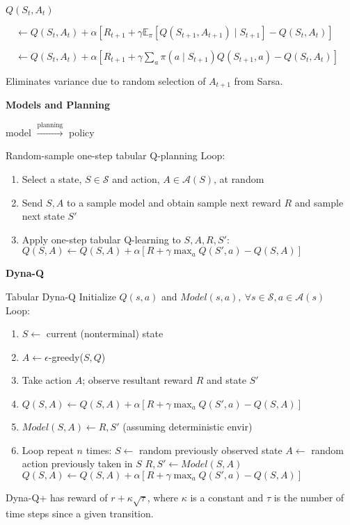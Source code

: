 \documentclass[twocolumn]{article}
\begin{document}
$Q(S_t, A_t)$

$\quad \leftarrow Q(S_t, A_t) + \alpha [R_{t+1} + \gamma \mathbb E_\pi [Q(S_{t+1}, A_{t+1}) \mid S_{t+1}] - Q(S_t, A_t)]$

$\quad\leftarrow Q(S_t, A_t) + \alpha[R_{t+1} + \gamma \sum_a \pi(a \mid S_{t+1}) Q(S_{t+1}, a) - Q(S_t, A_t)]$

Eliminates variance due to random selection of $A_{t+1}$ from Sarsa.


\newpage


\textbf{Models and Planning}

model $\xrightarrow{\text{planning}}$ policy

\begin{mydef}{Random-sample one-step tabular Q-planning}{}
    Loop:
    \begin{enumerate}
        \item Select a state, $S \in \mathcal S$ and action, $A \in \mathcal A(S)$, at random
        \item Send $S, A$ to a sample model and obtain sample next reward $R$ and sample next state $S'$
        \item Apply one-step tabular Q-learning to $S, A, R, S'$: \\
        $Q(S, A) \leftarrow Q(S, A) + \alpha [R + \gamma \max_a Q(S', a) - Q(S, A)]$
    \end{enumerate}
\end{mydef}

\dotfill

\textbf{Dyna-Q}

\begin{mydef}{Tabular Dyna-Q}{}
    Initialize $Q(s,a)$ and $Model(s,a),\ \forall s \in \mathcal S, a \in \mathcal A(s)$ \\
    Loop:
    \begin{enumerate}
        \item $S \leftarrow$ current (nonterminal) state
        \item $A \leftarrow \epsilon$-greedy($S,Q$)
        \item Take action $A$; observe resultant reward $R$ and state $S'$
        \item $Q(S,A) \leftarrow Q(S,A) + \alpha[R + \gamma \max_a Q(S',a) - Q(S, A)]$
        \item $Model(S,A) \leftarrow R, S'$ (assuming deterministic envir)
        \item Loop repeat $n$ times:
        \subitem$S \leftarrow$ random previously observed state
        \subitem$A \leftarrow$ random action previously taken in $S$
        \subitem$R,S' \leftarrow Model(S,A)$
        \subitem$Q(S,A) \leftarrow Q(S,A) + \alpha [R + \gamma \max_a Q(S', a) - Q(S,A)]$
    \end{enumerate}
\end{mydef}

Dyna-Q+ has reward of $r + \kappa \sqrt{\tau}$, where $\kappa$ is a constant and $\tau$ is the number of time steps since a given transition.

\vspace{-.5em}
\dotfill
\end{document}
